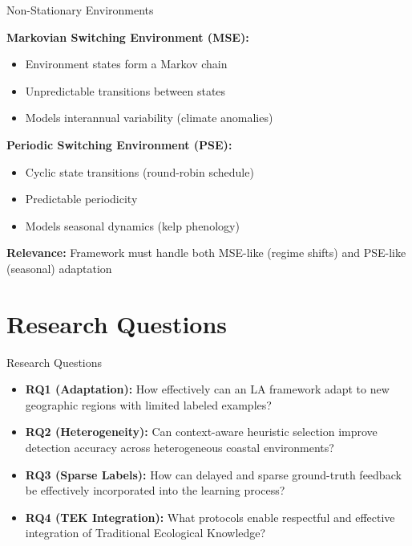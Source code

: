 \documentclass[10pt,xcolor={table,dvipsnames},t]{beamer}
\begin{document}
\begin{frame}{Non-Stationary Environments}

\textbf{Markovian Switching Environment (MSE):}
\begin{itemize}
  \item Environment states form a Markov chain
  \item Unpredictable transitions between states
  \item Models interannual variability (climate anomalies)
\end{itemize}

\vspace{0.5em}
\textbf{Periodic Switching Environment (PSE):}
\begin{itemize}
  \item Cyclic state transitions (round-robin schedule)
  \item Predictable periodicity
  \item Models seasonal dynamics (kelp phenology)
\end{itemize}

\vspace{0.5em}
\textbf{Relevance:} Framework must handle both MSE-like (regime shifts) and PSE-like (seasonal) adaptation

\end{frame}

\section{Research Questions}

\begin{frame}{Research Questions}

\begin{itemize}
  \item \textbf{RQ1 (Adaptation):} How effectively can an LA framework adapt to new geographic regions with limited labeled examples?

  \vspace{0.5em}
  \item \textbf{RQ2 (Heterogeneity):} Can context-aware heuristic selection improve detection accuracy across heterogeneous coastal environments?

  \vspace{0.5em}
  \item \textbf{RQ3 (Sparse Labels):} How can delayed and sparse ground-truth feedback be effectively incorporated into the learning process?

  \vspace{0.5em}
  \item \textbf{RQ4 (TEK Integration):} What protocols enable respectful and effective integration of Traditional Ecological Knowledge?
\end{itemize}

\end{frame}
\end{document}

